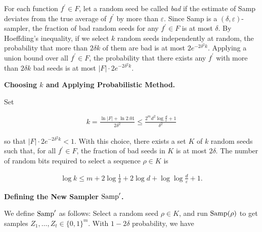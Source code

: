 \documentclass[10pt,a4paper]{article}
\begin{document}
For each function $f^{\prime}\in F$, let a random seed be called \emph{bad} if the estimate of Samp deviates from the true average of $f^{\prime}$ by more than $\varepsilon$. Since Samp is a $(\delta,\varepsilon)$-sampler, the fraction of bad random seeds for any $f^{\prime}\in F$ is at most $\delta$. By Hoeffding’s inequality, if we select $k$ random seeds independently at random, the probability that more than $2\delta k$ of them are bad is at most $2e^{-2\delta^{2}k}$.
Applying a union bound over all $f^{\prime}\in F$, the probability that there exists any $f^{\prime}$ with more than $2\delta k$ bad seeds is at most $\left|F\right|\cdot 2e^{-2\delta^{2}k}$.\par





\par\medskip\noindent\textbf{Choosing $k$ and Applying Probabilistic Method.}\par




Set\par


\[\begin{gathered}
k=\frac{\ln|F|+\ln 2.01}{2\delta^{2}}\leq\frac{2^{m}d^{2}\log\frac{d}{\varepsilon}+1}{\delta^{2}}
\end{gathered}\]


so that $|F|\cdot 2e^{-2\delta^{2}k}<1$. With this choice, there exists a set $K$ of $k$ random seeds such that, for all $f^{\prime}\in F$, the fraction of bad seeds in $K$ is at most $2\delta$. The number of random bits required to select a sequence $\rho\in K$ is\par


\[\begin{gathered}
\log k\leq m+2\log\frac{1}{\delta}+2\log d+\log\log\frac{d}{\varepsilon}+1.
\end{gathered}\]





\par\medskip\noindent\textbf{Defining the New Sampler $\textup{{Samp}}^{\prime}$.}\par




We define $\textup{{Samp}}^{\prime}$ as follows: Select a random seed $\rho\in K$, and run $\textup{{Samp}}(\rho)$ to get samples $Z_{1},\dots,Z_{t}\in\{0,1\}^{m}$. With $1-2\delta$ probability, we have\par
\end{document}
